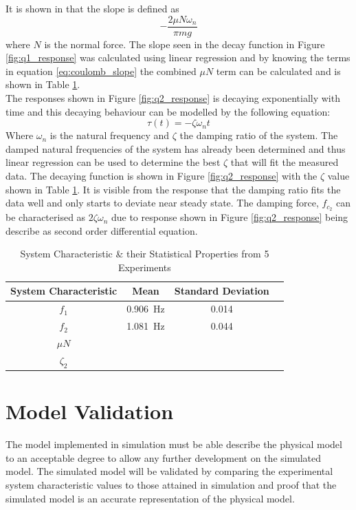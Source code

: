 It is shown in \citet{coulomb_friction} that the slope is defined as 
\begin{equation} \label{eq:coulomb_slope}
-\frac{2\mu N \omega_{n}}{\pi mg}
\end{equation}
where $N$  is the normal force. The slope seen in the decay function in Figure \ref{fig:q1_response} was calculated using linear regression and by knowing the terms in equation \ref{eq:coulomb_slope} the combined $\mu N$ term can be calculated and is shown in Table \ref{table:system_characteristic}.\\

The responses shown in Figure \ref{fig:q2_response} is decaying exponentially with time and this decaying behaviour can be modelled by the following equation: $$\tau(t) = -\zeta \omega_{n} t$$ Where $\omega_{n}$ is the natural frequency and $\zeta$ the damping ratio of the system. The damped natural frequencies of the system has already been determined and thus linear regression can be used to determine the best $\zeta$ that will fit the measured data. The decaying function is shown in Figure \ref{fig:q2_response} with the $\zeta$ value shown in Table \ref{table:system_characteristic}. It is visible from the response that the damping ratio fits the data well and only starts to deviate near steady state. The damping force, $f_{c_{2}}$ can be characterised as $2\zeta\omega_{n}$ due to response shown in Figure \ref{fig:q2_response} being describe as second order differential equation. 

\begin{table}[]
	\centering
	\begin{tabular}{|c|c|c|c|}
		\hline
		System Characteristic & Mean & Standard Deviation\\
		\hline
		\hline
		$f_{1}$ & \SI{0.906}{Hz} & 0.014 \\
		\hline
		$f_{2}$ & \SI{1.081}{Hz} & 0.044 \\ 
		\hline
		$\mu N$ & $ $ & $ $
		\\
		\hline
		$\zeta_{2}$ &  & \\
		\hline
	\end{tabular}
	\caption{System Characteristic \& their Statistical Properties from 5 Experiments}
	\label{table:system_characteristic}
\end{table}

\section{Model Validation}
The model implemented in simulation must be able describe the physical model to an acceptable degree to allow any further development on the simulated model. The simulated model will be validated by comparing the experimental system characteristic values to those attained in simulation and proof that the simulated model is an accurate representation of the physical model.\\

